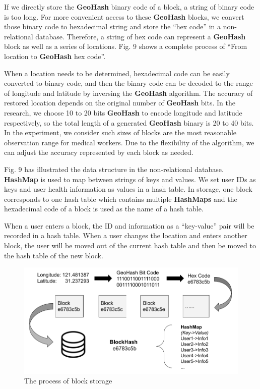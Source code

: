 \documentclass[conference]{IEEEtran}
\begin{document}
If we directly store the \textbf{GeoHash} binary code of a block, a string of binary code is too long.
For more convenient access to these \textbf{GeoHash} blocks, we convert those binary code to hexadecimal string and store the ``hex code'' in a non-relational database.
Therefore, a string of hex code can represent a \textbf{GeoHash} block as well as a series of locations.
Fig. 9 shows a complete process of ``From location to \textbf{GeoHash} hex code''.

When a location needs to be determined, hexadecimal code can be easily converted to binary code, and then the binary code can be decoded to the range of longitude and latitude by inversing the \textbf{GeoHash} algorithm.
The accuracy of restored location depends on the original number of \textbf{GeoHash} bits.
In the research, we choose 10 to 20 bits \textbf{GeoHash} to encode longitude and latitude respectively, so the total length of a generated \textbf{GeoHash} binary is 20 to 40 bits.
In the experiment, we consider such sizes of blocks are the most reasonable observation range for medical workers.
Due to the flexibility of the algorithm, we can adjust the accuracy represented by each block as needed.

Fig. 9 has illustrated the data structure in the non-relational database.
\textbf{HashMap} is used to map between strings of keys and values.
We set user IDs as keys and user health information as values in a hash table.
In storage, one block corresponds to one hash table which contains multiple \textbf{HashMaps} and the hexadecimal code of a block is used as the name of a hash table.

When a user enters a block, the ID and information as a ``key-value'' pair will be recorded in a hash table.
When a user changes the location and enters another block, the user will be moved out of the current hash table and then be moved to the hash table of the new block.
\begin{figure}[h]
    \centering
    \includegraphics[width=\linewidth]{block-storage.png}
    \caption{The process of block storage}
\end{figure}
\end{document}
